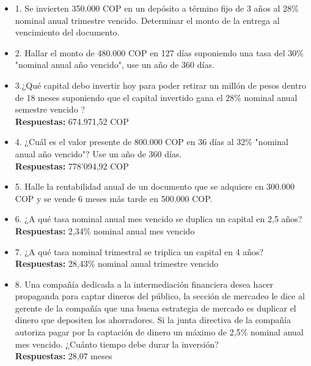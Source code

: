 \begin{itemize}

 \item 1.	Se invierten 350.000 COP en un depósito a término fijo de 3 años al 28\% nominal anual trimestre vencido. Determinar el monto de la entrega al vencimiento del documento.  \\
       \medskip

 \item 2. Hallar el monto de 480.000 COP en 127 días suponiendo una tasa del 30\% "nominal anual año vencido", use un año de 360 días.\\
       \medskip

 \item 3.¿Qué capital debo invertir hoy para poder retirar un millón de pesos dentro de 18 meses suponiendo que el capital invertido gana el 28\%  nominal anual semestre vencido ?\\

       \textbf{Respuestas:}  674.971,52 COP
       \medskip

 \item 4. ¿Cuál es el valor presente de 800.000 COP en 36 días al 32\% "nominal anual año vencido"? Use un año de 360 días.\\
       \textbf{Respuestas:}  778'094,92 COP
       \medskip

 \item 5. Halle la rentabilidad anual de un documento que se adquiere en 300.000 COP y se vende 6 meses más tarde en 500.000 COP. \\
       \medskip

 \item 6. ¿A qué tasa nominal anual mes vencido se duplica un capital en 2,5 años?  \\
       \textbf{Respuestas:} 2,34\% nominal anual mes vencido
       \medskip

 \item 7. ¿A qué tasa nominal trimestral se triplica un capital en 4 años?\\
       \textbf{Respuestas:} 28,43\% nominal anual trimestre vencido
       \medskip

 \item 8. Una compañía dedicada a la intermediación financiera desea hacer propaganda para captar dineros del público, la sección de mercadeo le dice al gerente de la compañía que una buena estrategia de mercado es duplicar el dinero que depositen los ahorradores. Si la junta directiva de la compañía autoriza pagar por la captación de dinero un máximo de 2,5\% nominal anual mes vencido. ¿Cuánto tiempo debe durar la inversión?  \\
       \textbf{Respuestas:} 28,07 meses
       \medskip


\end{itemize}
